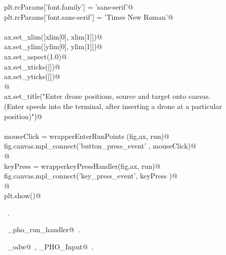 \documentclass[10.0pt]{report}
\begin{document}
\begin{flushleft}
\begin{list}{}{}
\mbox{}\verb@    plt.rcParams['font.family'] = 'sans-serif'@\\
\mbox{}\verb@    plt.rcParams['font.sans-serif'] = 'Times New Roman'@\\
\mbox{}\verb@@\\
\mbox{}\verb@    ax.set_xlim([xlim[0], xlim[1]])@\\
\mbox{}\verb@    ax.set_ylim([ylim[0], ylim[1]])@\\
\mbox{}\verb@    ax.set_aspect(1.0)@\\
\mbox{}\verb@    ax.set_xticks([])@\\
\mbox{}\verb@    ax.set_yticks([])@\\
\mbox{}\verb@          @\\
\mbox{}\verb@    ax.set_title("Enter drone positions, source and target onto canvas. \n \@\\
\mbox{}\verb@(Enter speeds into the terminal, after inserting a drone at a particular position)")@\\
\mbox{}\verb@@\\
\mbox{}\verb@    mouseClick   = wrapperEnterRunPoints (fig,ax, run)@\\
\mbox{}\verb@    fig.canvas.mpl_connect('button_press_event' , mouseClick)@\\
\mbox{}\verb@          @\\
\mbox{}\verb@    keyPress     = wrapperkeyPressHandler(fig,ax, run)@\\
\mbox{}\verb@    fig.canvas.mpl_connect('key_press_event', keyPress   )@\\
\mbox{}\verb@    @\\
\mbox{}\verb@    plt.show()@\\
\mbox{}\verb@@{\NWsep}
\end{list}
\vspace{-1.5ex}
\footnotesize
\begin{list}{}{\setlength{\itemsep}{-\parsep}\setlength{\itemindent}{-\leftmargin}}
\item \NWtxtMacroRefIn\ .
\item \NWtxtIdentsDefed\nobreak\  \verb@single_pho_run_handler@\nobreak\ .\item \NWtxtIdentsUsed\nobreak\  \verb@algo_odw@\nobreak\ , \verb@Single_PHO_Input@\nobreak\ .
\item{}
\end{list}
\vspace{4ex}
\end{flushleft}
\end{document}
